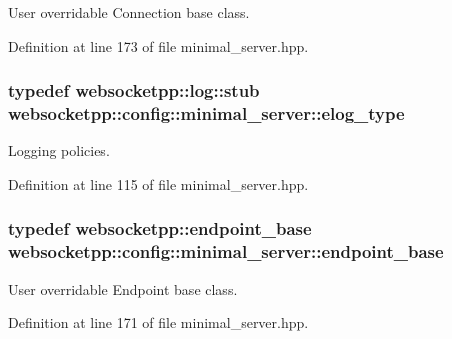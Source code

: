 User overridable Connection base class. 



Definition at line 173 of file minimal\+\_\+server.\+hpp.

\hypertarget{structwebsocketpp_1_1config_1_1minimal__server_ab8a516661fb2ddd3a3c377823b623c1a}{}
\subsubsection[{elog\+\_\+type}]{\setlength{\rightskip}{0pt plus 5cm}typedef {\bf websocketpp\+::log\+::stub} {\bf websocketpp\+::config\+::minimal\+\_\+server\+::elog\+\_\+type}}\label{structwebsocketpp_1_1config_1_1minimal__server_ab8a516661fb2ddd3a3c377823b623c1a}


Logging policies. 



Definition at line 115 of file minimal\+\_\+server.\+hpp.

\hypertarget{structwebsocketpp_1_1config_1_1minimal__server_ab656b89b039b38b52d0587acda673e0a}{}
\subsubsection[{endpoint\+\_\+base}]{\setlength{\rightskip}{0pt plus 5cm}typedef {\bf websocketpp\+::endpoint\+\_\+base} {\bf websocketpp\+::config\+::minimal\+\_\+server\+::endpoint\+\_\+base}}\label{structwebsocketpp_1_1config_1_1minimal__server_ab656b89b039b38b52d0587acda673e0a}


User overridable Endpoint base class. 



Definition at line 171 of file minimal\+\_\+server.\+hpp.

\hypertarget{structwebsocketpp_1_1config_1_1minimal__server_aeb6079297c7d7ceb1742178e00d11b34}{}
